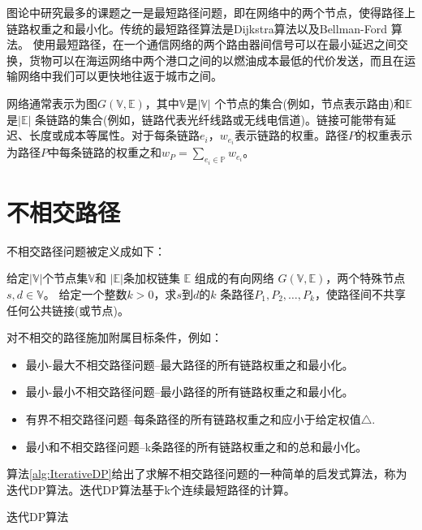 图论中研究最多的课题之一是最短路径问题，即在网络中的两个节点，使得路径上链路权重之和最小化。传统的最短路径算法是Dijkstra算法\cite{dijkstra1959note}以及Bellman-Ford 算法\cite{toth2002vehicle,ford2015flows}。 使用最短路径，在一个通信网络的两个路由器间信号可以在最小延迟之间交换，货物可以在海运网络中两个港口之间的以燃油成本最低的代价发送，而且在运输网络中我们可以更快地往返于城市之间。

网络通常表示为图$G(\mathbb{V},\mathbb{E})$，其中$\mathbb{V}$是$|\mathbb{V}|$ 个节点的集合(例如，节点表示路由)和$\mathbb{E}$是$|\mathbb{E}|$ 条链路的集合(例如，链路代表光纤线路或无线电信道)。链接可能带有延迟、长度或成本等属性。对于每条链路$e_i$，$w_{e_i}$表示链路的权重。路径$P$的权重表示为路径$P$中每条链路的权重之和$w_P=\sum\limits_{e_i\in \mathbb{P}}w_{e_i}$。
\section{不相交路径}
不相交路径问题被定义成如下：

\begin{definition}[不相交路径问题]
给定$|\mathbb{V}|$个节点集$\mathbb{V}$和 $|\mathbb{E}|$条加权链集 $\mathbb{E}$ 组成的有向网络 $G(\mathbb{V},\mathbb{E})$，两个特殊节点$s,d\in\mathbb{V}$。 给定一个整数$k>0$，求$s$到$d$的$k$ 条路径$P_1,P_2,\ldots,P_k$，使路径间不共享任何公共链接(或节点)。
\end{definition}

对不相交的路径施加附属目标条件，例如：
\begin{itemize}
  \item 最小-最大不相交路径问题--最大路径的所有链路权重之和最小化。
  \item 最小-最小不相交路径问题--最小路径的所有链路权重之和最小化。
  \item 有界不相交路径问题--每条路径的所有链路权重之和应小于给定权值$\bigtriangleup$.
  \item 最小和不相交路径问题--k条路径的所有链路权重之和的总和最小化。
\end{itemize}
算法\ref{alg:IterativeDP}给出了求解不相交路径问题的一种简单的启发式算法，称为迭代DP算法。迭代DP算法基于k个连续最短路径的计算。

\begin{algorithm}[htbp]
{
{
\renewcommand\baselinestretch{1.5}\selectfont %
\caption{迭代DP算法}
\label{alg:IterativeDP}
\begin{algorithmic}[1]
    \ENDFOR
\end{algorithmic}
}
\par}
\end{algorithm}

